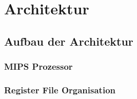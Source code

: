 \chapter{Architektur}
\label{chap:architecture}

\section{Aufbau der Architektur}
\label{chap:architecture_overview}

\subsection{MIPS Prozessor}
\subsection{Register File Organisation}

